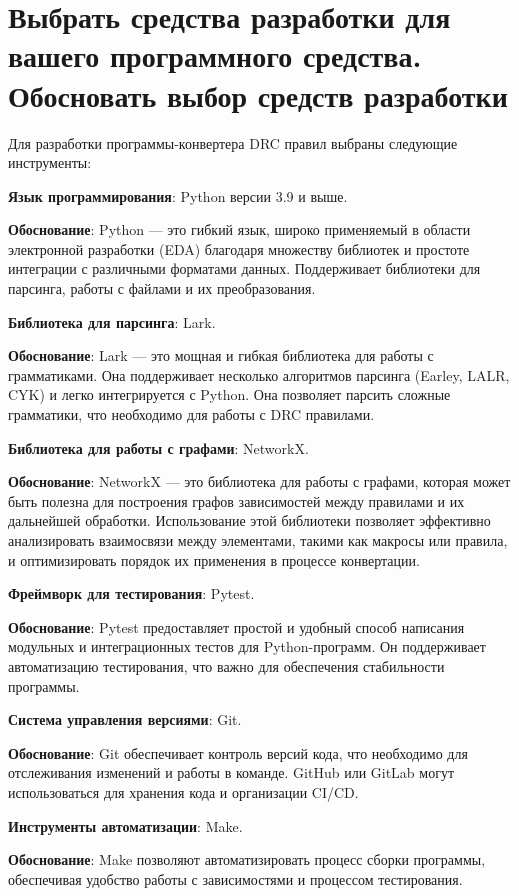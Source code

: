 \section{Выбрать средства разработки для вашего программного средства.
	Обосновать выбор средств разработки}

Для разработки программы-конвертера DRC правил выбраны следующие инструменты:

\textbf{Язык программирования}: Python версии 3.9 и выше.\par
\textbf{Обоснование}: Python --- это гибкий язык,
широко применяемый в области электронной разработки (EDA)
благодаря множеству библиотек
и простоте интеграции с различными форматами данных.
Поддерживает библиотеки для парсинга, работы с файлами и их преобразования.
  
\textbf{Библиотека для парсинга}: Lark.\par
\textbf{Обоснование}: Lark --- это мощная и гибкая библиотека
для работы с грамматиками.
Она поддерживает несколько алгоритмов парсинга (Earley, LALR, CYK)
и легко интегрируется с Python.
Она позволяет парсить сложные грамматики,
что необходимо для работы с DRC правилами.

\textbf{Библиотека для работы с графами}: NetworkX.\par
\textbf{Обоснование}: NetworkX --- это библиотека для работы с графами,
которая может быть полезна для построения графов зависимостей между правилами
и их дальнейшей обработки.
Использование этой библиотеки позволяет эффективно анализировать взаимосвязи
между элементами, такими как макросы или правила,
и оптимизировать порядок их применения в процессе конвертации.

\textbf{Фреймворк для тестирования}: Pytest.\par
\textbf{Обоснование}: Pytest предоставляет простой
и удобный способ написания модульных
и интеграционных тестов для Python-программ.
Он поддерживает автоматизацию тестирования,
что важно для обеспечения стабильности программы.

\textbf{Система управления версиями}: Git.\par
\textbf{Обоснование}: Git обеспечивает контроль версий кода,
что необходимо для отслеживания изменений и работы в команде.
GitHub или GitLab могут использоваться для хранения кода и организации CI/CD.

\textbf{Инструменты автоматизации}: Make.\par
\textbf{Обоснование}: Make позволяют автоматизировать процесс сборки программы,
обеспечивая удобство работы с зависимостями и процессом тестирования.

